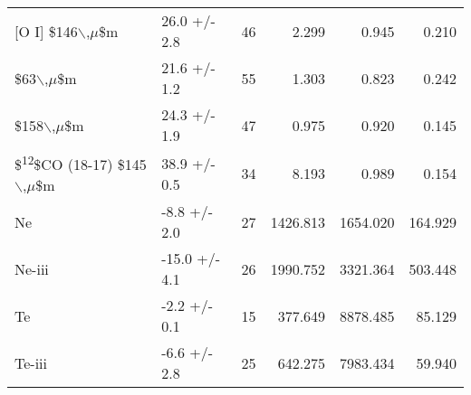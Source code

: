 \begin{tabular}{llrrrr}
[O I] \$146$\backslash$,\(\mu\)\$m & 26.0 +/- 2.8 & 46 & 2.299 & 0.945 & 0.210\\
[O I] \$63$\backslash$,\(\mu\)\$m & 21.6 +/- 1.2 & 55 & 1.303 & 0.823 & 0.242\\
[C II] \$158$\backslash$,\(\mu\)\$m & 24.3 +/- 1.9 & 47 & 0.975 & 0.920 & 0.145\\
\$\textsuperscript{12}\$CO (18-17) \$145$\backslash$,\(\mu\)\$m & 38.9 +/- 0.5 & 34 & 8.193 & 0.989 & 0.154\\
\hline
Ne & -8.8 +/- 2.0 & 27 & 1426.813 & 1654.020 & 164.929\\
Ne-iii & -15.0 +/- 4.1 & 26 & 1990.752 & 3321.364 & 503.448\\
Te & -2.2 +/- 0.1 & 15 & 377.649 & 8878.485 & 85.129\\
Te-iii & -6.6 +/- 2.8 & 25 & 642.275 & 7983.434 & 59.940\\
\hline
\end{tabular}
